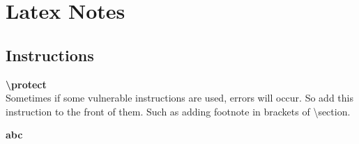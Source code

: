 \ifx\allfiles\undefined


	\else
	\fi
	\chapter{Latex Notes}
	\section{Instructions}
		\textbf{\backslash protect} \\
			Sometimes if some vulnerable instructions are used, errors will occur. So add this instruction to the front of them. Such as adding footnote in brackets of \backslash section. 
			
		\textbf{abc}
\ifx\allfiles\undefined

\fi